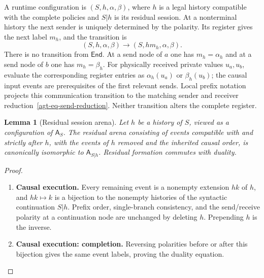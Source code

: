 \documentclass[11pt,a4paper]{article}
\numberwithin{equation}{section}
\newtheorem{lemma}[theorem]{Lemma}
\theoremstyle{definition}
\theoremstyle{remark}
\theoremstyle{plain}
\providecommand{\End}{\mathsf{End}}
\begin{document}
A runtime configuration is $(S,h,\alpha,\beta)$, where $h$ is a legal
history compatible with the complete policies and $S|h$ is its residual
session. At a nonterminal history the next sender is uniquely determined
by the polarity.  Its register gives the next label $m_h$, and the
transition is
\begin{equation}
 (S,h,\alpha,\beta)\longrightarrow
 (S,hm_h,\alpha,\beta).
 \label{agt-eq-runtime-transition}
\end{equation}
There is no transition from $\End$.  At a send node of $a$ one has
$m_h=\alpha_h$ and at a send node of $b$ one has $m_h=\beta_h$.
For physically received private values $u_a,u_b$, evaluate the corresponding
register entries as $\alpha_h(u_a)$ or $\beta_h(u_b)$; the causal input
events are prerequisites of the first relevant sends.  Local prefix
notation projects this communication transition to the matching sender
and receiver reduction~\eqref{agt-eq-send-reduction}.  Neither transition
alters the complete register.

\begin{lemma}[Residual session arena]
\label{agt-lem-residual-arena}
Let $h$ be a history of $S$, viewed as a configuration of $\mathsf A_S$.
The residual arena consisting of events compatible with and strictly
after $h$, with the events of $h$ removed and the inherited causal order,
is canonically isomorphic to $\mathsf A_{S|h}$.  Residual formation
commutes with duality.
\end{lemma}
\begin{proof}
\leavevmode
\begin{enumerate}[label=\textup{(\arabic*)},leftmargin=*,itemsep=4pt,topsep=3pt]
  \item \textbf{Causal execution.} Every remaining event is a nonempty extension $hk$ of $h$, and
$hk\mapsto k$ is a bijection to the nonempty histories of the syntactic
continuation $S|h$. Prefix order, single-branch consistency, and the
send/receive polarity at a continuation node are unchanged by deleting
$h$. Prepending $h$ is the inverse.
  \item \textbf{Causal execution: completion.} Reversing polarities before or after
this bijection gives the same event labels, proving the duality equation.
\end{enumerate}
\end{proof}
\end{document}
